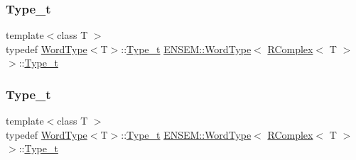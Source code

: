 \subsubsection{\texorpdfstring{Type\_t}{Type\_t}\hspace{0.1cm}{\footnotesize\ttfamily [1/3]}}
{\footnotesize\ttfamily template$<$class T $>$ \\
typedef \mbox{\hyperlink{structENSEM_1_1WordType}{Word\+Type}}$<$T$>$\+::\mbox{\hyperlink{structENSEM_1_1WordType_3_01RComplex_3_01T_01_4_01_4_a24d907e746d8f478924d91103a7da3d5}{Type\+\_\+t}} \mbox{\hyperlink{structENSEM_1_1WordType}{E\+N\+S\+E\+M\+::\+Word\+Type}}$<$ \mbox{\hyperlink{classENSEM_1_1RComplex}{R\+Complex}}$<$ T $>$ $>$\+::\mbox{\hyperlink{structENSEM_1_1WordType_3_01RComplex_3_01T_01_4_01_4_a24d907e746d8f478924d91103a7da3d5}{Type\+\_\+t}}}

\mbox{\label{structENSEM_1_1WordType_3_01RComplex_3_01T_01_4_01_4_a24d907e746d8f478924d91103a7da3d5}} 
\subsubsection{\texorpdfstring{Type\_t}{Type\_t}\hspace{0.1cm}{\footnotesize\ttfamily [2/3]}}
{\footnotesize\ttfamily template$<$class T $>$ \\
typedef \mbox{\hyperlink{structENSEM_1_1WordType}{Word\+Type}}$<$T$>$\+::\mbox{\hyperlink{structENSEM_1_1WordType_3_01RComplex_3_01T_01_4_01_4_a24d907e746d8f478924d91103a7da3d5}{Type\+\_\+t}} \mbox{\hyperlink{structENSEM_1_1WordType}{E\+N\+S\+E\+M\+::\+Word\+Type}}$<$ \mbox{\hyperlink{classENSEM_1_1RComplex}{R\+Complex}}$<$ T $>$ $>$\+::\mbox{\hyperlink{structENSEM_1_1WordType_3_01RComplex_3_01T_01_4_01_4_a24d907e746d8f478924d91103a7da3d5}{Type\+\_\+t}}}

\mbox{\label{structENSEM_1_1WordType_3_01RComplex_3_01T_01_4_01_4_a24d907e746d8f478924d91103a7da3d5}} 

